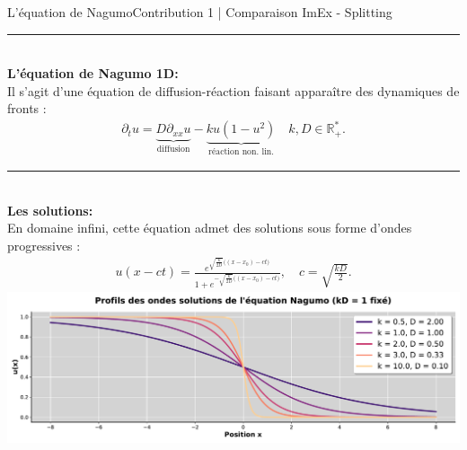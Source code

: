\begin{frame}{L'équation de Nagumo}{Contribution 1 | Comparaison ImEx - Splitting}
    \noindent\color{Primary}\rule{\linewidth}{0.6pt}\color{black}\\
        \textbf{L'équation de Nagumo 1D:\\}
        Il s'agit d'une équation de diffusion-réaction faisant apparaître des dynamiques de fronts :
            \begin{align}
                \partial_t{u} = \underbrace{D \partial_{xx}u}_{\text{diffusion}}
                        - \underbrace{ku(1-u^2)}_{\text{réaction non. lin.}}\quad k,D \in \mathbb{R^*_+}.
            \end{align}
    \pause
    \noindent\color{Primary}\rule{\linewidth}{0.6pt}\color{black}\\
        \textbf{Les solutions:\\}
            En domaine infini, cette équation admet des solutions sous forme d'ondes progressives :
        \begin{align}\label{eq:sol_nagumo}
            u(x-ct) = \frac{e^{\sqrt{\frac{k}{2D}} \bigl((x-x_0) - ct \bigr)}}
                        {1 + e^{-\sqrt{\frac{k}{2D}} \bigl((x-x_0) - ct \bigr)}},\quad c = \sqrt{\frac{kD}{2}}.
\end{align}
\centering
\includegraphics[height = .3 \textheight]{ medias/2_/1_/profils_nagumo.pdf }
\end{frame}